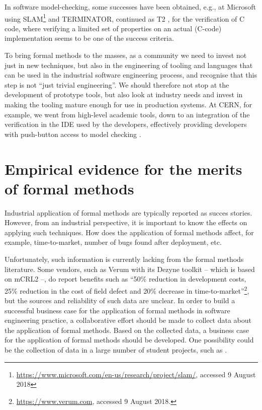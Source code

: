 \documentclass[sigplan]{acmart}\settopmatter{printfolios=true,printccs=false,printacmref=false}
\begin{document}
In software model-checking, some successes have been obtained, e.g., at
Microsoft using
SLAM\footnote{\url{https://www.microsoft.com/en-us/research/project/slam/}, accessed 9
August 2018} \cite{SLAM} and TERMINATOR, continued as T2 \cite{T2}, for the
verification of C code, where verifying a limited set of properties on an actual
(C-code) implementation seems to be one of the success criteria.

To bring formal methods to the masses, as a community we need to invest not just
in new techniques, but also in the engineering of tooling and languages that
can be used in the industrial software engineering process, and recognise that this step is not ``just trivial engineering''. We should therefore not stop
at the development of prototype tools, but also look at industry needs and 
invest in making the tooling mature enough for use in production systems. At CERN, for example, we went from high-level academic tools, down to an integration of the verification in the IDE used by the developers, effectively providing developers with push-button access to model checking \cite{hwong_formalising_2013}.

\section{Empirical evidence for the merits of formal methods}

Industrial application of formal methods are typically reported as succes stories.
However, from an industrial perspective, it is important to know the effects on
applying such techniques. How does the application of formal methods affect, for
example, time-to-market, number of bugs found after deployment, etc.

Unfortunately, such information is currently lacking from the formal methods
literature. Some vendors, such as Verum with its Dezyne toolkit -- which is based on mCRL2 \cite{dezyne_mcrl2} --, do report
benefits such as ``50\% reduction in development costs, 25\% reduction in the
cost of field defect and 20\% decrease in
time-to-market''\footnote{\url{https://www.verum.com}, accessed 9 August 2018.}, but the sources and reliability of such data are unclear.
In order to build a successful business case for the application of formal
methods in software engineering practice, a collaborative effort should be made
to collect data about the application of formal methods. Based on the collected
data, a business case for the application of formal methods should be developed. One possibility could be the collection of data in a large number of student projects, such as \cite{Rouwen2018}.
\end{document}
